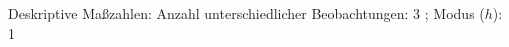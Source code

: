 				\label{tableValues:bstu05b}
				\vspace*{-\baselineskip}
                    \begin{noten}
                	    \note{} Deskriptive Maßzahlen:
                	    Anzahl unterschiedlicher Beobachtungen: 3%
                	    ; 
                	      Modus ($h$): 1
                     \end{noten}


